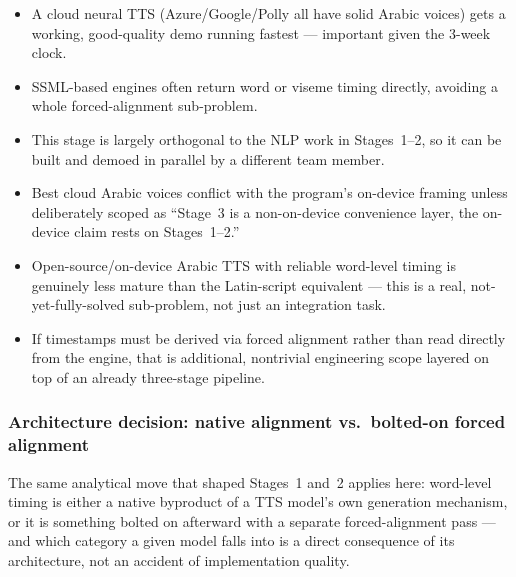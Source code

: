 \documentclass[11pt,a4paper]{article}
\newcommand{\proscons}[2]{%
  \begin{minipage}[t]{0.485\textwidth}
    \begin{prosbox}
      \begin{itemize}[leftmargin=1.1em,itemsep=1pt,topsep=1pt]
        #1
      \end{itemize}
    \end{prosbox}
  \end{minipage}\hfill
  \begin{minipage}[t]{0.485\textwidth}
    \begin{consbox}
      \begin{itemize}[leftmargin=1.1em,itemsep=1pt,topsep=1pt]
        #2
      \end{itemize}
    \end{consbox}
  \end{minipage}
}
\begin{document}
\proscons{
  \item A cloud neural TTS (Azure/Google/Polly all have solid Arabic voices) gets
  a working, good-quality demo running fastest --- important given the 3-week
  clock.
  \item SSML-based engines often return word or viseme timing directly, avoiding
  a whole forced-alignment sub-problem.
  \item This stage is largely orthogonal to the NLP work in Stages~1--2, so it
  can be built and demoed in parallel by a different team member.
}{
  \item Best cloud Arabic voices conflict with the program's on-device framing
  unless deliberately scoped as ``Stage~3 is a non-on-device convenience layer,
  the on-device claim rests on Stages~1--2.''
  \item Open-source/on-device Arabic TTS with reliable word-level timing is
  genuinely less mature than the Latin-script equivalent --- this is a real,
  not-yet-fully-solved sub-problem, not just an integration task.
  \item If timestamps must be derived via forced alignment rather than read
  directly from the engine, that is additional, nontrivial engineering scope
  layered on top of an already three-stage pipeline.
}

\subsubsection{Architecture decision: native alignment vs.\ bolted-on forced alignment}
\label{sec:tts-arch}

The same analytical move that shaped Stages~1 and~2 applies here: word-level
timing is either a native byproduct of a TTS model's own generation
mechanism, or it is something bolted on afterward with a separate
forced-alignment pass --- and which category a given model falls into is a
direct consequence of its architecture, not an accident of implementation
quality.
\end{document}
